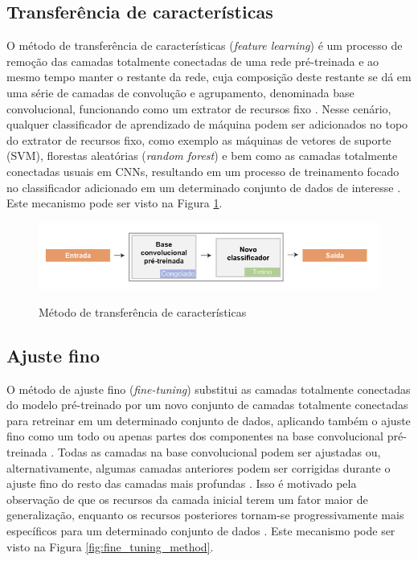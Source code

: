\documentclass[
	12pt,				%
	oneside,			%
	a4paper,			%
	english,			%
	brazil				%
	]{abntex2ppgsi}
\begin{document}
\subsection{Transferência de características}
O método de transferência de características (\textit{feature learning}) é um processo de remoção das camadas totalmente conectadas de uma rede pré-treinada e ao mesmo tempo manter o restante da rede, cuja composição deste restante se dá em uma série de camadas de convolução e agrupamento, denominada base convolucional, funcionando como um extrator de recursos fixo \cite{li2017learning}. Nesse cenário, qualquer classificador de aprendizado de máquina podem ser adicionados no topo do extrator de recursos fixo, como exemplo as máquinas de vetores de suporte (SVM), florestas aleatórias (\textit{random forest}) e bem como as camadas totalmente conectadas usuais em CNNs, resultando em um processo de treinamento focado no classificador adicionado em um determinado conjunto de dados de interesse \cite{li2017learning}. Este mecanismo pode ser visto na Figura \ref{fig:fixed_features_extraction}.

\begin{figure}[H]
    \centering
    \caption{Método de transferência de características}
    \includegraphics[scale=.55]{imagens/conceitos_basicos/fixed_features_extraction.jpg}
    \label{fig:fixed_features_extraction}
\end{figure}

\subsection{Ajuste fino}
O método de ajuste fino (\textit{fine-tuning}) substitui as camadas totalmente conectadas do modelo pré-treinado por um novo conjunto de camadas totalmente conectadas para retreinar em um determinado conjunto de dados, aplicando também o ajuste fino como um todo ou apenas partes dos componentes na base convolucional pré-treinada \cite{li2017learning}. Todas as camadas na base convolucional podem ser ajustadas ou, alternativamente, algumas camadas anteriores podem ser corrigidas durante o ajuste fino do resto das camadas mais profundas \cite{li2017learning}. Isso é motivado pela observação de que os recursos da camada inicial terem um fator maior de generalização, enquanto os recursos posteriores tornam-se progressivamente mais específicos para um determinado conjunto de dados \cite{li2017learning}. Este mecanismo pode ser visto na Figura \ref{fig:fine_tuning_method}.
\end{document}
